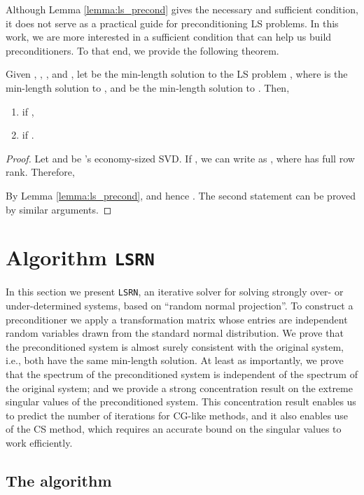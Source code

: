 \documentclass{siamltex}
\begin{document}
Although Lemma \ref{lemma:ls_precond} gives the necessary and sufficient
condition, it does not serve as a practical guide for preconditioning LS
problems.  In this work, we are more interested in a sufficient condition that
can help us build preconditioners.  To that end, we provide the following
theorem.

\begin{theorem}
  \label{thm:ls_precond_sufficient}
  Given , , , and , let  be
  the min-length solution to the LS problem ,
   where  is the min-length solution to , and  be the min-length solution to
  .  Then,
  \begin{enumerate}
  \item  if ,
  \item  if .
  \end{enumerate} 
\end{theorem}

\begin{proof} 
  Let  and  be 's economy-sized SVD. If
  , we can write  as
  , where  has full row rank. Therefore,
  
  By Lemma \ref{lemma:ls_precond},  and hence
  . The second statement can be proved by similar
  arguments.
\end{proof}


\section{Algorithm \texttt{LSRN}}
\label{sec:prec-via-rand}

In this section we present \texttt{LSRN}, an iterative solver for
solving strongly over- or under-determined systems, based on ``random
normal projection''.  To construct a preconditioner we apply a
transformation matrix whose entries are independent random variables
drawn from the standard normal distribution.  We prove that the
preconditioned system is almost surely consistent with the original
system, i.e., both have the same min-length solution.  At least as
importantly, we prove that the spectrum of the preconditioned system
is independent of the spectrum of the original system; and we provide
a strong concentration result on the extreme singular values of the
preconditioned system.  This concentration result enables us to
predict the number of iterations for CG-like methods, and it also
enables use of the CS method, which requires an accurate bound on the
singular values to work efficiently.

\subsection{The algorithm}
\label{subsec:the_alg}
\end{document}
